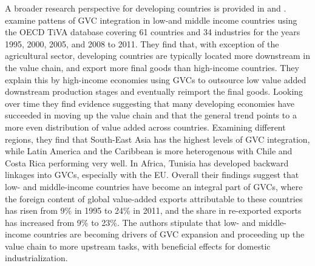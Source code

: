 \documentclass[a4paper]{article}
\begin{document}
A broader research perspective for developing countries is provided in \citet{Kummritz20162} and \citet{Kummritz20161}. \citet{Kummritz20162} examine pattens of GVC integration in low-and middle income countries using the OECD TiVA database covering 61 countries and 34 industries for the years 1995, 2000, 2005, and 2008 to 2011. They find that, with exception of the agricultural sector, developing countries are typically located more downstream in the value chain, and export more final goods than high-income countries. They explain this by high-income economies using GVCs to outsource low value added downstream production stages and eventually reimport the final goods. Looking over time they find evidence suggesting that many developing economies have succeeded in moving up the value chain and that the general trend points to a more even distribution of value added across countries. Examining different regions, they find that South-East Asia has the highest levels of GVC integration, while Latin America and the Caribbean is more heterogenous with Chile and Costa Rica performing very well. In Africa, Tunisia has developed backward linkages into GVCs, especially with the EU. Overall their findings suggest that low- and middle-income countries have become an integral part of GVCs, where the foreign content of global value-added exports attributable to these countries has risen from 9\% in 1995 to 24\% in 2011, and the share in re-exported exports has increased from 9\% to 23\%. The authors stipulate that low- and middle-income countries are becoming drivers of GVC expansion and proceeding up the value chain to more upstream tasks, with beneficial effects for domestic industrialization. \newline
\end{document}
